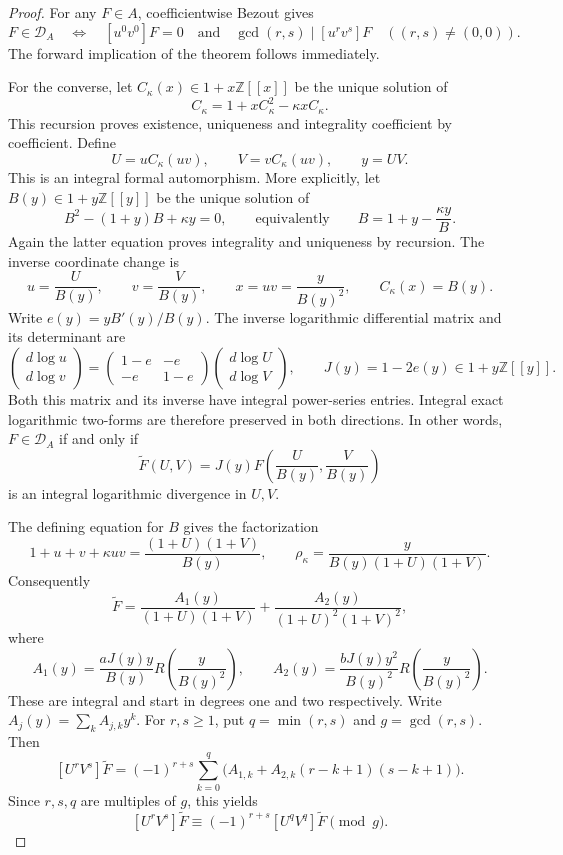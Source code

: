 \documentclass[11pt,a4paper]{article}
\numberwithin{equation}{section}
\theoremstyle{remark}
\begin{document}
\begin{proof}
For any $F\in A$, coefficientwise Bezout gives
\[
 F\in\mathcal D_A
 \quad\Longleftrightarrow\quad
 [u^0v^0]F=0\quad\text{and}\quad
 \gcd(r,s)\mid[u^rv^s]F\quad((r,s)\ne(0,0)).
\]
The forward implication of the theorem follows immediately.

For the converse, let $C_\kappa(x)\in1+x\mathbb Z[[x]]$ be
the unique solution of
\[
 C_\kappa=1+xC_\kappa^2-\kappa xC_\kappa.
\]
This recursion proves existence, uniqueness and integrality
coefficient by coefficient. Define
\[
 U=uC_\kappa(uv),\qquad V=vC_\kappa(uv),\qquad y=UV.
\]
This is an integral formal automorphism. More explicitly, let
$B(y)\in1+y\mathbb Z[[y]]$ be the unique solution of
\[
 B^2-(1+y)B+\kappa y=0,
 \qquad\text{equivalently}\qquad
 B=1+y-\frac{\kappa y}{B}.
\]
Again the latter equation proves integrality and uniqueness by
recursion. The inverse coordinate change is
\[
 u=\frac U{B(y)},\qquad v=\frac V{B(y)},\qquad
 x=uv=\frac y{B(y)^2},\qquad C_\kappa(x)=B(y).
\]
Write $e(y)=yB'(y)/B(y)$. The inverse logarithmic differential
matrix and its determinant are
\[
 \begin{pmatrix}d\log u\\d\log v\end{pmatrix}
 =\begin{pmatrix}1-e&-e\\-e&1-e\end{pmatrix}
 \begin{pmatrix}d\log U\\d\log V\end{pmatrix},
 \qquad J(y)=1-2e(y)\in1+y\mathbb Z[[y]].
\]
Both this matrix and its inverse have integral power-series
entries. Integral exact logarithmic two-forms are therefore
preserved in both directions. In other words, $F\in\mathcal D_A$
if and only if
\[
 \widetilde F(U,V)=J(y)F\left(\frac U{B(y)},\frac V{B(y)}\right)
\]
is an integral logarithmic divergence in $U,V$.

The defining equation for $B$ gives the factorization
\[
 1+u+v+\kappa uv=\frac{(1+U)(1+V)}{B(y)},
 \qquad
 \rho_\kappa=\frac{y}{B(y)(1+U)(1+V)}.
\]
Consequently
\[
 \widetilde F
 =\frac{A_1(y)}{(1+U)(1+V)}
  +\frac{A_2(y)}{(1+U)^2(1+V)^2},
\]
where
\[
 A_1(y)=\frac{aJ(y)y}{B(y)}R\left(\frac y{B(y)^2}\right),
 \qquad
 A_2(y)=\frac{bJ(y)y^2}{B(y)^2}R\left(\frac y{B(y)^2}\right).
\]
These are integral and start in degrees one and two respectively.
Write $A_j(y)=\sum_k A_{j,k}y^k$. For $r,s\ge1$, put
$q=\min(r,s)$ and $g=\gcd(r,s)$. Then
\[
 [U^rV^s]\widetilde F
 =(-1)^{r+s}\sum_{k=0}^{q}
 \bigl(A_{1,k}+A_{2,k}(r-k+1)(s-k+1)\bigr).
\]
Since $r,s,q$ are multiples of $g$, this yields
\[
 [U^rV^s]\widetilde F
 \equiv(-1)^{r+s}[U^qV^q]\widetilde F\pmod g.
\]


\end{proof}
\end{document}
